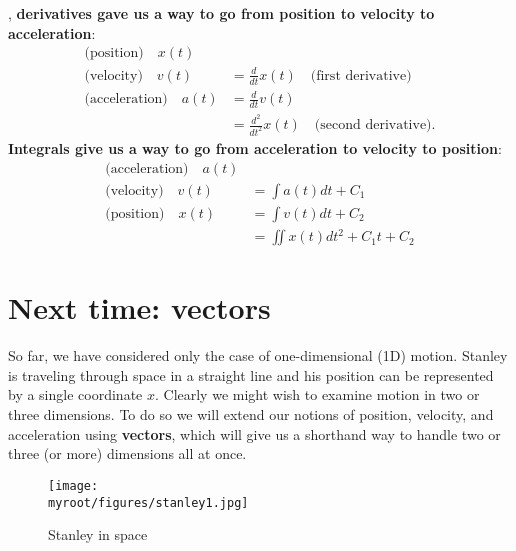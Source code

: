 \documentclass{tufte-handout}
\newcommand\myroot{..}
\begin{document}
, \textbf{derivatives gave us a way to go from position to velocity to acceleration}:
\begin{align}
\text{(position)}\quad x(t) & \\
\text{(velocity)}\quad v(t) &= \frac{d}{dt} x(t)\quad\text{(first derivative)} \\
\text{(acceleration)}\quad a(t) &= \frac{d}{dt} v(t) \\
&= \frac{d^2}{dt^2} x(t)\quad\text{(second derivative)}.
\end{align}
\textbf{Integrals give us a way to go from acceleration to velocity to position}:
\begin{align}
\text{(acceleration)}\quad a(t) & \\
\text{(velocity)}\quad v(t) &= \int a(t) dt + C_1 \\
\text{(position)}\quad x(t) &= \int v(t) dt + C_2 \\
&= \iint x(t) dt^2 + C_1 t + C_2 
\end{align}




\section{Next time: vectors}
So far, we have considered only the case of one-dimensional (1D) motion. Stanley is traveling through space in a straight line and his position can be represented by a single coordinate $x$. Clearly we might wish to examine motion in two or three dimensions. To do so we will extend our notions of position, velocity, and acceleration using \textbf{vectors}, which will give us a shorthand way to handle two or three (or more) dimensions all at once. 


\begin{figure}[h]
\begin{center}
\texttt{[image: \\myroot/figures/stanley1.jpg]}
\end{center}
\caption{Stanley in space}
\end{figure}
\end{document}
